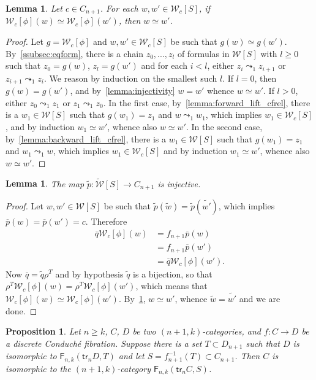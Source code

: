 \documentclass[reqno]{amsart}
\theoremstyle{plain}
\newtheorem{proposition}[subsubsection]{Proposition}
\newtheorem{lemma}[subsubsection]{Lemma}
\theoremstyle{definition}
\theoremstyle{remark}
\newcommand{\pair}[2]{(#1,#2)}       %
\newcommand{\functor}[1]{\mathsf{#1}} %
\newcommand{\trk}[1]{\functor{tr}_{#1}}%
\newcommand{\frf}[1]{\functor{F}_{#1}} %
\newcommand{\clx}[2]{\pair{#1}{#2}}%
\newcommand{\WW}{\mathcal{W}}
\newcommand{\clWW}{\fcls{\WW}}
\newcommand{\wtx}[1]{\WW[#1]} %
\newcommand{\wtxr}[2]{\WW_{#1}[#2]} %
\newcommand{\wtxeq}[1]{\clWW[#1]} %
\newcommand{\cfrel}{\leadsto_1} %
\newcommand{\freq}{\simeq} %
\newcommand{\cans}[1]{\rho^{#1}} %
\newcommand{\fcls}[1]{\widetilde{#1}}%
\newcommand{\extend}[1]{\overline{#1}} %
\begin{document}
 \begin{lemma}\label{lemma:lift_freq}
 Let $c\in C_{n+1}$. For each $w,w'\in\wtxr c{S}$, if $\wtxr
  c\phi(w)\freq \wtxr c\phi (w')$, then $w\freq w'$.
\end{lemma}
\begin{proof}
  Let $g=\wtxr c\phi$ and $w,w'\in\wtxr cS$ be such that $g(w)\freq
  g(w')$. By~\ref{ssubsec:eqform}, there is a chain $z_0,...,z_l$ of
  formulas in $\wtx S$ with $l\geq 0$ such that $z_0=g(w)$, $z_l=g(w')$ and for each
  $i<l$, either $z_i\cfrel z_{i+1}$ or $z_{i+1}\cfrel z_i$. We reason
  by induction on the smallest such $l$. If $l=0$, then $g(w)=g(w')$,
  and by~\cref{lemma:injectivity} $w=w'$ whence $w\freq w'$. If
  $l>0$, either $z_0\cfrel z_1$ or $z_1\cfrel z_0$. In the first case,
  by~\cref{lemma:forward_lift_cfrel}, there is a $w_1\in\wtx S$ such
  that $g(w_1)=z_1$ and $w\cfrel w_1$, which implies $w_1\in\wtxr cS$,
  and by induction $w_1\freq w'$, whence also $w\freq w'$. In the
  second case, by~\cref{lemma:backward_lift_cfrel}, there is a
  $w_1\in\wtx S$ such that $g(w_1)=z_1$ and $w_1\cfrel w$, which
  implies $w_1\in\wtxr cS$ and by induction $w_1\freq w'$, whence also
  $w\freq w'$. 
\end{proof}
\begin{lemma}\label{lemma:inj}
 The map $\fcls p:\wtxeq S\to
 C_{n+1}$ is injective.
\end{lemma}
\begin{proof}
  Let $w,w'\in\wtx S$ be such that $\fcls p(\fcls w)=\fcls
  p(\fcls{w'})$, which implies $\extend p(w)=\extend p(w')=c$. Therefore
  \begin{align*}
    \extend q\wtxr c\phi(w) & = f_{n+1}\extend p(w)\\
                         & = f_{n+1}\extend p(w')\\
                         & = \extend q\wtxr c\phi(w').
  \end{align*}
  Now $\extend q=\fcls q\cans T$ and by hypothesis $\fcls q$ is a
  bijection, so that $\cans T\wtxr c\phi(w)=\cans T\wtxr c\phi(w')$, which
  means that $\wtxr c\phi(w)\freq \wtxr
  c\phi(w')$. By~\cref{lemma:lift_freq}, $w\freq w'$, whence $\fcls
  w=\fcls{w'}$ and we are done. \end{proof}
\begin{proposition}\label{prop:sum_up}
  Let $n\geq k$, $C$, $D$ be two $\pair{n{+}1}{k}$-categories, and $f:C\to D$ be a
  discrete Conduché fibration. Suppose there is a set $T\subset D_{n+1}$ such
  that $D$ is isomorphic to $\frf{n,k}\clx{\trk nD}{T}$ and  let
  $S=f_{n+1}^{-1}(T)\subset C_{n+1}$. Then $C$ is isomorphic to the
  $\pair{n{+}1}k$-category $\frf{n,k}\clx{\trk nC}{S}$.
\end{proposition}
\end{document}
